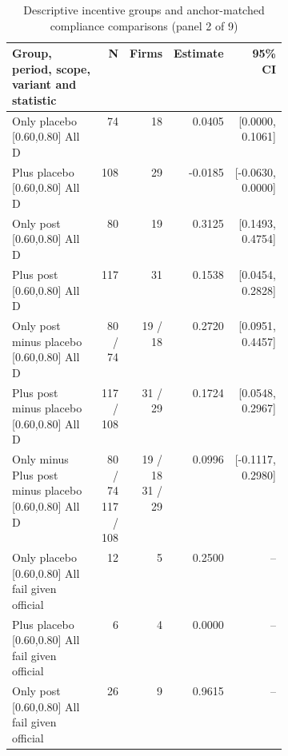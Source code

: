 \begin{table}[!htbp]\centering\scriptsize
\caption{Descriptive incentive groups and anchor-matched compliance comparisons (panel 2 of 9)}
\begin{threeparttable}
\begin{tabular}{p{0.40\linewidth}rrrr}
\toprule
Group, period, scope, variant and statistic & N & Firms & Estimate & 95\% CI \\
\midrule
Only placebo [0.60,0.80] All D & 74 & 18 & 0.0405 & [0.0000, 0.1061] \\
Plus placebo [0.60,0.80] All D & 108 & 29 & -0.0185 & [-0.0630, 0.0000] \\
Only post [0.60,0.80] All D & 80 & 19 & 0.3125 & [0.1493, 0.4754] \\
Plus post [0.60,0.80] All D & 117 & 31 & 0.1538 & [0.0454, 0.2828] \\
Only post minus placebo [0.60,0.80] All D & 80 / 74 & 19 / 18 & 0.2720 & [0.0951, 0.4457] \\
Plus post minus placebo [0.60,0.80] All D & 117 / 108 & 31 / 29 & 0.1724 & [0.0548, 0.2967] \\
Only minus Plus post minus placebo [0.60,0.80] All D & \shortstack{80 / 74\\117 / 108} & \shortstack{19 / 18\\31 / 29} & 0.0996 & [-0.1117, 0.2980] \\
Only placebo [0.60,0.80] All fail given official & 12 & 5 & 0.2500 & -- \\
Plus placebo [0.60,0.80] All fail given official & 6 & 4 & 0.0000 & -- \\
Only post [0.60,0.80] All fail given official & 26 & 9 & 0.9615 & -- \\
\bottomrule
\end{tabular}
\begin{tablenotes}[flushleft]\footnotesize

\end{tablenotes}
\end{threeparttable}
\end{table}
